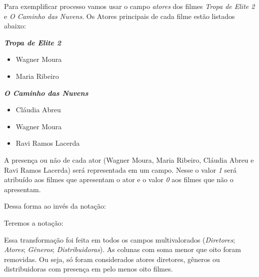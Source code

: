\documentclass[11pt,a4paper]{article}
\newenvironment{myblock}[1]{%
    \tcolorbox[
    noparskip,
    colback=LightCoral,
    colframe=DarkRed,%
    title=#1]}%
    {\endtcolorbox}
\begin{document}
\begin{myblock}{Campos multivalorados à campos booleanos}
Para exemplificar processo vamos usar o campo \textit{atores} dos filmes \textit{Tropa de Elite 2} e \textit{O Caminho das Nuvens}. Os Atores principais de cada filme estão listados abaixo:

\vspace*{0.2cm}

\textbf{\textit{Tropa de Elite 2}}
\begin{itemize}
\item Wagner Moura
\item Maria Ribeiro
\end{itemize}

\textbf{\textit{O Caminho das Nuvens}}
\begin{itemize}
\item Cláudia Abreu
\item Wagner Moura
\item Ravi Ramos Lacerda
\end{itemize}

A presença ou não de cada ator (Wagner Moura, Maria Ribeiro, Cláudia Abreu e Ravi Ramos Lacerda) será representada em um campo. Nesse o valor \textit{1} será atribuído aos filmes que apresentam o ator e o valor \textit{0} aos filmes que não o apresentam. 

Dessa forma ao invés da notação:

\vspace*{0.5cm}


\vspace*{0.5cm}

Teremos a notação:

\vspace*{0.5cm}


\vspace*{0.5cm}


Essa transformação foi feita em todos os campos multivalorados (\textit{Diretores}; \textit{Atores}; \textit{Gêneros}; \textit{Distribuidoras}). As colunas com soma menor que oito foram removidas. Ou seja, só foram considerados atores diretores, gêneros ou distribuidoras com presença em pelo menos oito filmes.


\end{myblock}
\end{document}
